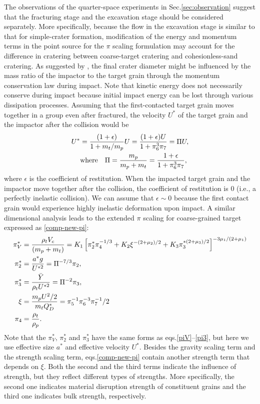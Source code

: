 \documentclass[3p,authoryear]{elsarticle}
\begin{document}
The observations of the quarter-space experiments in Sec.\ref{sec:observation} suggest that the fracturing stage and the excavation stage should be considered separately.
More specifically, because the flow in the excavation stage is similar to that for simple-crater formation, modification of the energy and momentum terms in the point source for the $\pi$ scaling formulation may account for the difference in cratering between coarse-target cratering and cohesionless-sand cratering.
As suggested by \citet{guettler2012}, the final crater diameter might be influenced by the mass ratio of the impactor to the target grain through the momentum conservation law during impact.
Note that kinetic energy does not necessarily conserve during impact because initial impact energy can be lost through various dissipation processes.
Assuming that the first-contacted target grain moves together in a group even after fractured, the velocity $U^*$ of the target grain and the impactor after the collision would be
\begin{align}
	U^*&=\frac{(1+\epsilon)}{1+m_t/m_p}U=\frac{(1+\epsilon)U}{1+\pi_6^3\pi_7}=\Pi U,\\
	&{\rm where}\quad \Pi=\frac{m_p}{m_p+m_t}=\frac{1+\epsilon}{1+\pi_6^3\pi_7},\notag
\end{align}
where $\epsilon$ is the coefficient of restitution.
When the impacted target grain and the impactor move together after the collision, the coefficient of restitution is 0 (i.e., a perfectly inelastic collision).
We can assume that $\epsilon \sim 0$ because the first contact grain would experience highly inelastic deformation upon impact.
A similar dimensional analysis leads to the extended $\pi$ scaling for coarse-grained target expressed as \eqref{comp-new-pi}:
\begin{align}
	\pi_V^*&=\frac{\rho_t V_c}{(m_p+m_t)}=K_1\left[\pi^*_2\pi_4^{-1/3}+K_2\xi^{-(2+\mu_2)/2}+K_3\pi_3^{*(2+\mu_3)/2} \right]^{-3\mu_1/(2+\mu_1)} \label{comp-new-pi}\\
	\pi_2^*&=\frac{a^*g}{U^{*2}}=\Pi^{-7/3}\pi_2, \notag\\
	 \pi_3^*&=\frac{\bar{Y}}{\rho_tU^{*2}}=\Pi^{-2}\pi_3, \notag\\
	 \xi&=\frac{m_pU^2/2}{m_tQ_D^*}=\pi_5^{-1}\pi_6^{-3}\pi_7^{-1}/2 \notag\\
	 \pi_4&=\frac{\rho_t}{\rho_p}.\notag
\end{align}
Note that the $\pi_V^*,\,\pi_2^*$ and $\pi_3^*$ have the same forms as eqs.\eqref{piV}--\eqref{pi3}, but here we use effective size $a^*$ and effective velocity $U^*$. Besides the gravity scaling term and the strength scaling term, eqs.\eqref{comp-new-pi} contain another strength term that depends on $\xi$. Both the second and the third terms indicate the influence of strength, but they reflect different types of strengths. More specifically, the second one indicates material disruption strength of constituent grains and the third one indicates bulk strength, respectively.
\end{document}
